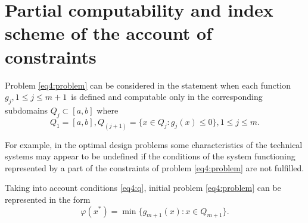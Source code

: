 \documentclass[graybox]{svmult}
\begin{document}

\section{Partial computability and index scheme of the account of constraints}
Problem \eqref{eq4:problem} can be considered in the statement when each function $g_j,1\le j\le m+1$ is defined and computable only in the corresponding subdomains $Q_j\subset [a,b]$ where
\begin{equation}
  \label{eq4:q}
  Q_1=[a,b],Q_(j+1)=\{x\in Q_j:g_j(x)\le 0\},1\le j\le m.
\end{equation}

For example, in the optimal design problems some characteristics of the technical systems may appear to be undefined if the conditions of the system functioning represented by a part of the constraints of problem \eqref{eq4:problem} are not fulfilled.

Taking into account conditions \eqref{eq4:q}, initial problem \eqref{eq4:problem} can be represented in the form
\begin{equation}
  \label{eq4:problem2}
  \varphi(x^*)=\min\{g_{m+1}(x):x\in Q_{m+1}\}.
\end{equation}
\end{document}
